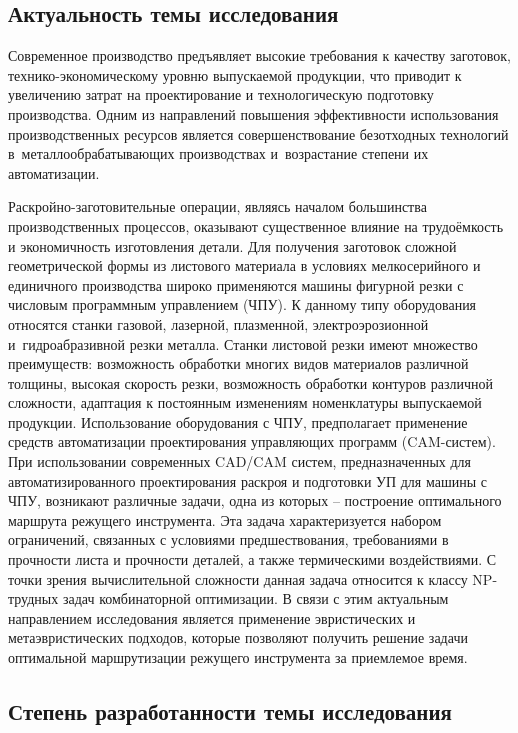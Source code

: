 \documentclass[14pt]{extarticle}
\theoremstyle{plain}%
\theoremstyle{remark}
\begin{document}
\subsection*{Актуальность темы исследования}

Современное производство предъявляет высокие требования к качеству
заготовок, технико-экономическому уровню выпускаемой продукции, что
приводит к увеличению затрат на проектирование и технологическую подготовку
производства. Одним из направлений повышения эффективности использования
производственных ресурсов является совершенствование безотходных технологий
в~металлообрабатывающих производствах и~возрастание степени их автоматизации.

Раскройно-заготовительные операции,
являясь началом большинства производственных процессов,
оказывают существенное влияние на трудоёмкость
и экономичность изготовления детали.
Для получения заготовок сложной
геометрической формы из листового материала в условиях мелкосерийного и
единичного производства широко применяются машины фигурной резки с
числовым программным управлением
(ЧПУ).
К данному типу оборудования
относятся станки газовой, лазерной, плазменной, электроэрозионной
и~гидроабразивной резки металла. Станки листовой резки имеют множество
преимуществ: возможность обработки многих видов материалов различной
толщины, высокая скорость резки, возможность обработки контуров различной
сложности, адаптация к постоянным изменениям номенклатуры выпускаемой
продукции. Использование оборудования с ЧПУ, предполагает применение
средств автоматизации проектирования управляющих программ
(CAM-систем).
При использовании современных CAD/CAM систем, предназначенных для
автоматизированного проектирования раскроя и подготовки УП для машины с
ЧПУ, возникают различные задачи, одна из которых -- построение оптимального
маршрута режущего инструмента.
Эта задача характеризуется набором
ограничений, связанных с условиями предшествования, требованиями в прочности
листа и прочности деталей, а также термическими воздействиями.
С точки зрения
вычислительной сложности данная задача относится к классу NP-трудных задач
комбинаторной оптимизации. В связи с этим актуальным направлением
исследования является применение эвристических и метаэвристических подходов,
которые позволяют получить решение задачи
оптимальной маршрутизации
режущего инструмента
за приемлемое время.

\subsection*{Степень разработанности темы исследования}
\end{document}
